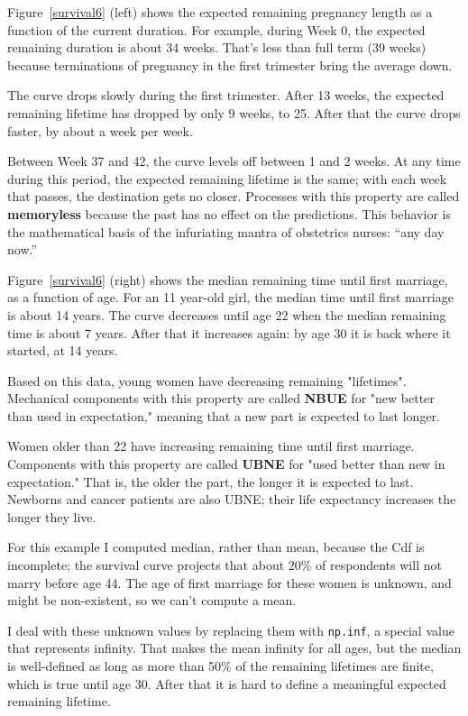 \documentclass[12pt]{book}
\begin{document}
Figure~\ref{survival6} (left) shows the expected remaining pregnancy
length as a function of the current duration.  For example, during
Week 0, the expected remaining duration is about 34 weeks.  That's
less than full term (39 weeks) because terminations of pregnancy
in the first trimester bring the average down.

The curve drops slowly during the first trimester.  After 13 weeks,
the expected remaining lifetime has dropped by only 9 weeks, to
25.  After that the curve drops faster, by about a week per week.

Between Week 37 and 42, the curve levels off between 1 and 2 weeks.
At any time during this period, the expected remaining lifetime is the
same; with each week that passes, the destination gets no closer.
Processes with this property are called {\bf memoryless} because
the past has no effect on the predictions.
This behavior is the mathematical basis of the infuriating mantra
of obstetrics nurses: ``any day now.''

Figure~\ref{survival6} (right) shows the median remaining time until
first marriage, as a function of age.  For an 11 year-old girl, the
median time until first marriage is about 14 years.  The curve decreases
until age 22 when the median remaining time is about 7 years.
After that it increases again: by age 30 it is back where it started,
at 14 years.

Based on this data, young women have decreasing remaining
"lifetimes".  Mechanical components with this property are called {\bf NBUE}
for "new better than used in expectation," meaning that a new part is
expected to last longer.

Women older than 22 have increasing remaining time until first
marriage.  Components with this property are called {\bf UBNE} for
"used better than new in expectation."  That is, the older the part,
the longer it is expected to last.  Newborns and cancer patients are
also UBNE; their life expectancy increases the longer they live.

For this example I computed median, rather than mean, because the
Cdf is incomplete; the survival curve projects that about 20\%
of respondents will not marry before age 44.  The age of
first marriage for these women is unknown, and might be non-existent,
so we can't compute a mean.

I deal with these unknown values by replacing them with {\tt np.inf},
a special value that represents infinity.  That makes the mean
infinity for all ages, but the median is well-defined as long as
more than 50\% of the remaining lifetimes are finite, which is true
until age 30.  After that it is hard to define a meaningful
expected remaining lifetime.
\end{document}
